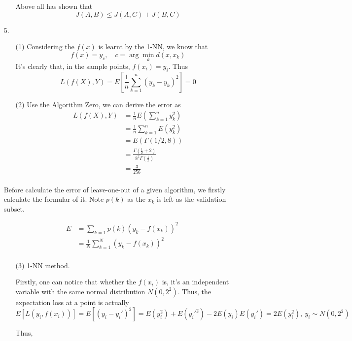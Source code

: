 \documentclass{article}
\begin{document}
\begin{enumerate}
\begin{enumerate}
        Above all has shown that
        \[J(A, B) \le J(A, C) + J(B, C)\]

    \end{enumerate}


\item[5.] 
    \begin{enumerate}
        \item[(1)] Considering the \(f(x)\) is learnt by the 1-NN, we know that 
        \[f(x) = y_c,\quad c = \arg\min_k d(x, x_k)\]
        It's clearly that, in the sample points, \(f(x_i) = y_i\). Thus
        \[L(f(X), Y) = E[\frac 1 n \sum_{k = 1}^n {(y_k - y_k)}^2] = 0\]

        \item[(2)] Use the Algorithm Zero, we can derive the error as
        \begin{align*}
            L(f(X), Y) &= \frac 1 n E(\sum_{k = 1}^n y_k^2)\\
            &= \frac 1 n \sum_{k = 1}^n E(y_k^2)\\
            &= E(\Gamma(1/2, 8))\\
            &= \frac{\Gamma(\frac 1 2 + 2)}{8^2\Gamma(\frac 1 2)}\\
            &= \frac{3}{256}\\
        \end{align*}
    \end{enumerate}

    Before calculate the error of leave-one-out of a given algorithm, we firstly calculate the formular of it. Note \(p(k)\) as the \(x_k\) is left as the validation subset.

    \begin{align*}
        E &= \sum_{k = 1}p(k){{(y_k - f(x_k))}^2}\\
        &= \frac 1 N \sum_{k = 1}^N {{(y_k - f(x_k))}^2}\\
    \end{align*}

    \begin{enumerate}
        \item[(3)] 1-NN method. 
        
        Firstly, one can notice that whether the \(f(x_i)\) is, it's an independent variable with the same normal distribution \(N(0, 2^2)\). Thus, the expectation loss at a point is actually 
        \[E[L(y_i, f(x_i))] = E[(y_i - y_i')^2] = E(y_i^2) + E(y_i'^2) - 2E(y_i)E(y_i') = 2E(y_i^2),\ y_i \sim N(0, 2^2)\]
        
        Thus,


\end{enumerate}
\end{enumerate}
\end{document}

